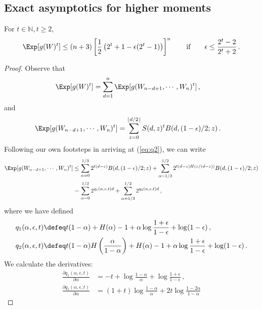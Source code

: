 \subsection{Exact asymptotics for higher moments}
\begin{proposition}\label{prop:grinding-power-moment}
For $t \in \mathbb{N}, t \geq 2$,
\[
\Exp[ g(W)^t ] 
\leq 
(n+3)\left[\frac{1}{2}\left( 2^t + 1 - \epsilon (2^t -1) \right)\right]^n 
\qquad \text{if} \qquad \epsilon \leq \frac{2^t - 2}{2^t + 2}\, .
\]
\end{proposition}
\begin{proof}
Observe that
\begin{align*}
\Exp[ g(W)^t ]
&= \sum_{d = 1}^n{ \Exp[ g(W_{n-d+1}, \cdots, W_n)^t ] }\, ,
\end{align*}
and
\begin{align*}
\Exp[ g(W_{n-d+1}, \cdots, W_n)^t ] 
&= \sum_{z = 0}^{\lfloor d/2 \rfloor} {S(d,z)^t  B(d, (1-\epsilon)/2; z) } \, .
\end{align*}
Following our own footsteps in arriving at (\ref{eq:q2}), we can write
\begin{align*}
\Exp[ g(W_{n-d+1}, \cdots, W_n)^t ] 
&\leq \sum_{\alpha=0}^{1/3}{2^{t(d-z)} B(d, (1-\epsilon)/2; z) } 
+ \sum_{\alpha=1/3}^{1/2}{2^{t(d-z)H(z/(d-z))} B(d, (1-\epsilon)/2; z) } \\
&= \sum_{\alpha=0}^{1/3}{2^{q_1(\alpha, \epsilon, t)d}} 
+ \sum_{\alpha=1/3}^{1/2}{2^{q_2(\alpha, \epsilon, t)d}} \, ,
\end{align*}
where we have defined
\begin{align} 
q_1(\alpha, \epsilon, t)
& \defeq t(1-\alpha) +
H(\alpha) 
-1  + \alpha \log \frac{1+\epsilon}{1-\epsilon} + \log (1-\epsilon) \label{eq:q1t} \, ,\\
q_2(\alpha, \epsilon, t)
& \defeq t(1-\alpha) H\left( \frac{\alpha}{1-\alpha} \right) +
H(\alpha) 
-1  + \alpha \log \frac{1+\epsilon}{1-\epsilon} + \log (1-\epsilon) \label{eq:q2t}\, .
\end{align}
We calculate the derivatives:
\begin{align*}
\frac{\partial q_1(\alpha, \epsilon, t)}{\partial \alpha}
&= -t 
+ \log \frac{1-\alpha}{\alpha}
+ \log \frac{1+\epsilon}{1-\epsilon} \, ,
\\
\frac{\partial q_1(\alpha, \epsilon, t)}{\partial \alpha}
&= 
(1+t) \log \frac{1-\alpha}{\alpha} 
+ 2 t \log \frac{1 - 2 \alpha}{1 - \alpha}

\end{align*}
\end{proof}
